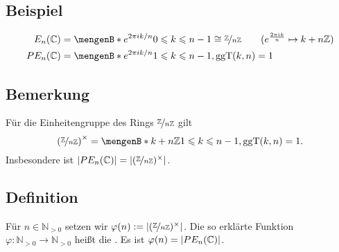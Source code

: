 \subsection[Beispiel: Einheitswurzeln in $\mathds{C}$]{Beispiel} %
\label{sub:193}
\begin{align*}
	E_n(\mathds{C}) &= \set[e^{2 \pi i k /n}]{0 \le k \le n-1} \cong \nicefrac{\mathds{Z}}{n \mathds{Z}} \tag{$e^{\frac{2 \pi i k}{n} } \mapsto k+ n \mathds{Z}$} \\
	PE_n(\mathds{C}) &= \set[e^{2 \pi i k /n}]{1 \le k \le n-1 , \ggT(k,n)=1}  
\end{align*}

\subsection[Bemerkung: Vergleich der Einheiten in $\nicefrac{\mathds{Z}}{n \mathds{Z}}$ mit $PE_n(\mathds{C})$]{Bemerkung} %
\label{sub:194}
Für die Einheitengruppe des Rings $\nicefrac{\mathds{Z}}{n \mathds{Z}}$ gilt
\[
	\enbrace*{\nicefrac{\mathds{Z}}{n \mathds{Z}}}^\times = \set[k+ n \mathds{Z}]{1 \le k \le n-1, \ggT(k,n)=1}.  
\]
Insbesondere ist $\abs*{PE_n(\mathds{C})} = \abs*{(\nicefrac{\mathds{Z}}{n \mathds{Z}})^\times}$.

\subsection[Definition: Eulersche $\varphi$-Funktion]{Definition} %
\label{sub:195}
Für $n \in \mathds{N}_{>0}$ setzen wir $\varphi(n) := \abs*{ (\nicefrac{\mathds{Z}}{n \mathds{Z}})^\times} $. Die so erklärte Funktion 
$\varphi : \mathds{N}_{>0} \to \mathds{N}_{>0}$ heißt die . Es ist $\varphi(n) = \abs*{PE_n(\mathds{C})} $.

